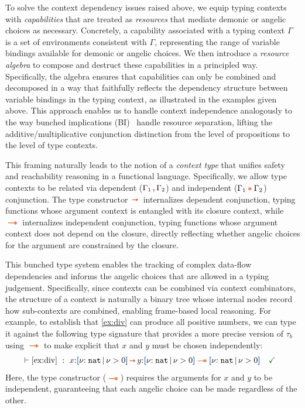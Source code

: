 To solve the context dependency issues raised above, we equip typing
contexts with \emph{capabilities} that are treated as \emph{resources}
that mediate demonic or angelic choices as necessary.  Concretely, a
capability associated with a typing context $\Gamma$ is a set of
environments consistent with $\Gamma$, representing the range of
variable bindings available for demonic or angelic choices.  We then
introduce a \emph{resource algebra} to compose and destruct these
capabilities in a principled way.  Specifically, the algebra ensures
that capabilities can only be combined and decomposed in a way that
faithfully reflects the dependency structure between variable bindings
in the typing context, as illustrated in the examples given above.
This approach enables us to handle context independence analogously to
the way bunched implications (BI)~\cite{OHP99} handle resource
separation, lifting the additive/multiplicative conjunction
distinction from the level of propositions to the level of type
contexts.

This framing naturally leads to the notion of a \emph{context type}
that unifies safety and reachability reasoning in a functional
language.  Specifically, we allow type contexts to be related via
dependent ($\Gamma_1 \ctcomma \Gamma_2$) and independent
($\Gamma_1 \ctstar \Gamma_2$) conjunction.  The type constructor
$\ctsarr$ internalizes dependent conjunction, typing functions whose
argument context is entangled with its closure context, while
$\ctwand$ internalizes independent conjunction, typing functions whose
argument context does not depend on the closure, directly reflecting
whether angelic choices for the argument are constrained by the
closure.

This bunched type system enables the tracking of complex data-flow
dependencies and informs the angelic choices that are allowed in a
typing judgement.  Specifically, since contexts can be combined via
context combinators, the structure of a context is naturally a binary
tree whose internal nodes record how sub-contexts are combined,
enabling frame-based local reasoning.  For example, to establish that
\ref{ex:div} can produce all positive numbers, we can type it against
the following type signature that provides a more precise version of $\tau_b$
using $\ctwand$ to make explicit that $x$ and $y$ must be chosen independently:
\vspace{-0.2em}
\begin{align*}
  & \vdash \ref{ex:div} ~:~ x{:}\urt{\Nat}{\vnu > 0} \ctsarr y{:}\urt{\Nat}{\vnu > 0} \ctwand \urt{\Nat}{\vnu > 0} \quad \judgok
\end{align*}\noindent
Here, the type constructor ($\ctwand$) requires the arguments for $x$
and $y$ to be independent, guaranteeing that each angelic choice can
be made regardless of the other.

